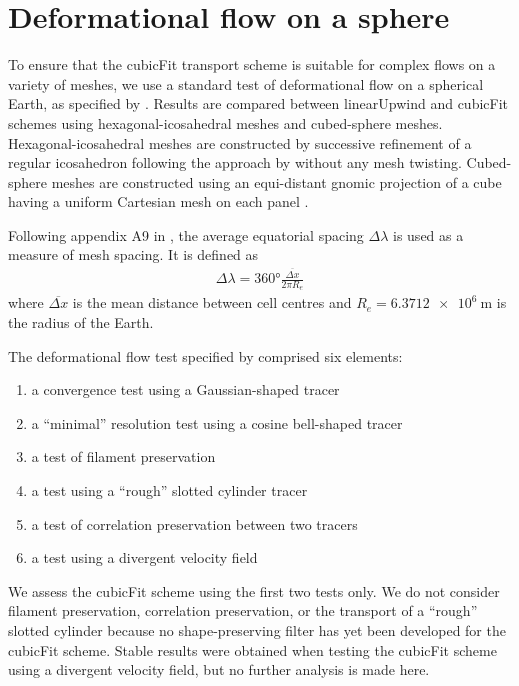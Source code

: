 \section{Deformational flow on a sphere}
\label{sec:cubicFit:deformationSphere}

To ensure that the cubicFit transport scheme is suitable for complex flows on a variety of meshes, we use a standard test of deformational flow on a spherical Earth, as specified by \citet{lauritzen2012}.  
Results are compared between linearUpwind and cubicFit schemes using hexagonal-icosahedral meshes and cubed-sphere meshes.
Hexagonal-icosahedral meshes are constructed by successive refinement of a regular icosahedron following the approach by \citet{thuburn2014,heikes-randall1995a,heikes-randall1995b} without any mesh twisting.
Cubed-sphere meshes are constructed using an equi-distant gnomic projection of a cube having a uniform Cartesian mesh on each panel \citep{staniforth-thuburn2012}.

Following appendix A9 in \citet{lauritzen2014}, the average equatorial spacing $\Delta \lambda$ is used as a measure of mesh spacing.  It is defined as
\begin{align}
	\Delta \lambda = \ang{360} \frac{\overline{\Delta x}}{2 \pi R_e}
\end{align}
where $\overline{\Delta x}$ is the mean distance between cell centres and $R_e = \SI{6.3712e6}{\meter}$ is the radius of the Earth.

The deformational flow test specified by \citet{lauritzen2012} comprised six elements:
\begin{enumerate}
\item a convergence test using a Gaussian-shaped tracer
\item a ``minimal'' resolution test using a cosine bell-shaped tracer
\item a test of filament preservation
\item a test using a ``rough'' slotted cylinder tracer
\item a test of correlation preservation between two tracers
\item a test using a divergent velocity field
\end{enumerate}
We assess the cubicFit scheme using the first two tests only.  We do not consider filament preservation, correlation preservation, or the transport of a ``rough'' slotted cylinder because no shape-preserving filter has yet been developed for the cubicFit scheme.  Stable results were obtained when testing the cubicFit scheme using a divergent velocity field, but no further analysis is made here.


